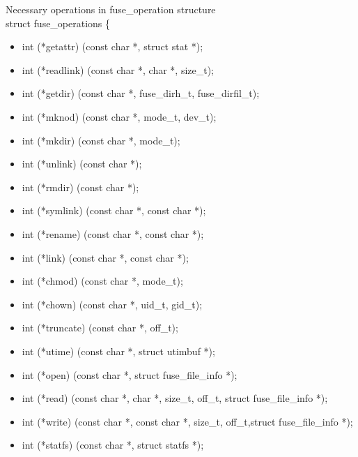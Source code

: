 Necessary operations in fuse\_operation structure \cite{Writing_a_FUSE_Filesystem}\\
struct fuse\_operations \{
\begin{itemize}

\item  int (*getattr) (const char *, struct stat *);

\item int (*readlink) (const char *, char *, size\_t);

\item int (*getdir) (const char *, fuse\_dirh\_t, fuse\_dirfil\_t);

\item int (*mknod) (const char *, mode\_t, dev\_t);

\item int (*mkdir) (const char *, mode\_t);

\item int (*unlink) (const char *);

\item int (*rmdir) (const char *);

\item int (*symlink) (const char *, const char *);

\item int (*rename) (const char *, const char *);

\item int (*link) (const char *, const char *);

\item int (*chmod) (const char *, mode\_t);

\item int (*chown) (const char *, uid\_t, gid\_t);

\item int (*truncate) (const char *, off\_t);

\item int (*utime) (const char *, struct utimbuf *);

\item int (*open) (const char *, struct fuse\_file\_info *);

\item int (*read) (const char *, char *, size\_t, off\_t, struct fuse\_file\_info *);

\item int (*write) (const char *, const char *, size\_t, off\_t,struct fuse\_file\_info *);

\item int (*statfs) (const char *, struct statfs *);


\end{itemize}

